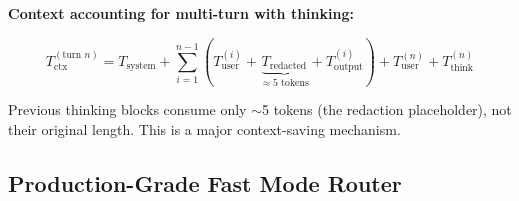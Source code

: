 \documentclass[11pt,a4paper]{article}
\begin{document}
\textbf{Context accounting for multi-turn with thinking:}

$$T_{\text{ctx}}^{(\text{turn } n)} = T_{\text{system}} + \sum_{i=1}^{n-1} (T_{\text{user}}^{(i)} + \underbrace{T_{\text{redacted}}}_{\approx 5 \text{ tokens}} + T_{\text{output}}^{(i)}) + T_{\text{user}}^{(n)} + T_{\text{think}}^{(n)}$$

Previous thinking blocks consume only $\sim$5 tokens (the redaction placeholder), not their original length. This is a major context-saving mechanism.

\subsection{Production-Grade Fast Mode Router}
\end{document}
